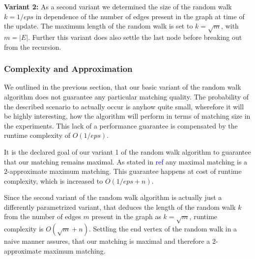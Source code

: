 \documentclass{article}      %
\newcommand\todo[1]{\textcolor{blue}{#1}}
\begin{document}
\bigskip
\noindent
\textbf{Variant 2:} As a second variant we determined the size of the random walk $k=1/eps$ in dependence of the number of edges present in the graph at time of the update. The maximum length of the random walk is set to $k=\sqrt{m}$, with $m = |E|$. Further this variant does also settle the last node before breaking out from the recursion.

\subsubsection{Complexity and Approximation}
\label{sec:rw-complx-approx}

We outlined in the previous section, that our basic variant of the random walk algorithm does not guarantee any particular matching quality. The probability of the described scenario to actually occur is anyhow quite small, wherefore it will be highly interesting, how the algorithm will perform in terms of matching size in the experiments. This lack of a performance guarantee is compensated by the runtime complexity of $O(1/eps)$.

It is the declared goal of our variant 1 of the random walk algorithm to guarantee that our matching remains maximal. As stated in \todo{ref} any maximal matching is a $2$-approximate maximum matching. This guarantee happens at cost of runtime complexity, which is increased to $O(1/eps + n)$.

Since the second variant of the random walk algorithm is actually just a differently parametrized variant, that deduces the length of the random walk $k$ from the number of edges $m$ present in the graph as $k=\sqrt{m}$, runtime complexity is $O(\sqrt{m}+n)$. Settling the end vertex of the random walk in a naive manner assures, that our matching is maximal and therefore a $2$-approximate maximum matching.



\end{document}
